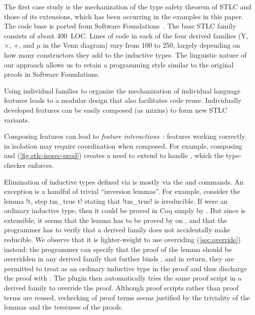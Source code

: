 



The first case study is the mechanization of the type safety theorem of
STLC and those of its extensions,
which has been occurring in the examples in this paper.
The code base is ported from Software Foundations~\cite{sf-pl}.
%
The base STLC family consists of about 400~LOC.
Lines of code in each of the four derived families
($\mathrm{Y}$, $\times$, $+$, and $\mu$ in the Venn diagram)
vary from 100 to 250, largely depending on how many constructors they
add to the inductive types.
%
The linguistic nature of our approach allows us to retain a programming
style similar to the original proofs in Software Foundations.



Using individual families to organize the mechanization of individual
language features leads to a modular design that also facilitates code reuse.
%
Individually developed features can be easily composed (as mixins) to
form new STLC variants.

Composing features can lead to \emph{feature interactions}~\cite{batory2011feature}:
features working correctly in isolation may require coordination when composed.
For example, composing  and 
(\cref{fig:stlc-isorec-prod}) creates a need to extend  to
handle , which the type-checker enforces.

Elimination of inductive types defined via  is
mostly via the  and  commands.
An exception is a handful of trivial ``inversion lemmas''.
For example, consider the lemma \lsti!\forall t, \neg step tm_true t!
stating that \lsti!tm_true! is irreducible.
If  were an ordinary inductive type, then it could be proved in Coq
simply by .
But since  is extensible, it seems that the lemma has to be
proved by  on , and that the programmer
has to verify that a derived family does not accidentally make  reducible.
%
We observe that it is lighter-weight to use overriding (\cref{sec:override}) instead:
the programmer can specify that the proof of the lemma should be overridden
in any derived family that further binds ,
and in return, they are permitted to treat  as an ordinary
inductive type in the proof and thus discharge the proof with .
The plugin then automatically tries the same proof script in a derived
family to override the proof. Although proof scripts rather
than proof terms are reused, rechecking of proof terms seems justified
by the triviality of the lemmas and the terseness of the proofs.

